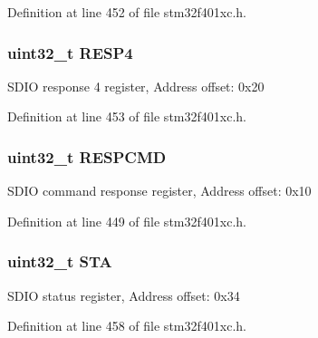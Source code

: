 Definition at line 452 of file stm32f401xc.\+h.

\subsubsection[{\texorpdfstring{R\+E\+S\+P4}{RESP4}}]{ uint32\+\_\+t R\+E\+S\+P4}\hypertarget{struct_s_d_i_o___type_def_ac760383de212de696f504e744c6fca7e}{}\label{struct_s_d_i_o___type_def_ac760383de212de696f504e744c6fca7e}
S\+D\+IO response 4 register, Address offset\+: 0x20 

Definition at line 453 of file stm32f401xc.\+h.

\subsubsection[{\texorpdfstring{R\+E\+S\+P\+C\+MD}{RESPCMD}}]{ uint32\+\_\+t R\+E\+S\+P\+C\+MD}\hypertarget{struct_s_d_i_o___type_def_aad371db807e2db4a2edf05b3f2f4b6cd}{}\label{struct_s_d_i_o___type_def_aad371db807e2db4a2edf05b3f2f4b6cd}
S\+D\+IO command response register, Address offset\+: 0x10 

Definition at line 449 of file stm32f401xc.\+h.

\subsubsection[{\texorpdfstring{S\+TA}{STA}}]{ uint32\+\_\+t S\+TA}\hypertarget{struct_s_d_i_o___type_def_a7520cdf6f3df68c2f147bdd87fb8a96f}{}\label{struct_s_d_i_o___type_def_a7520cdf6f3df68c2f147bdd87fb8a96f}
S\+D\+IO status register, Address offset\+: 0x34 

Definition at line 458 of file stm32f401xc.\+h.



